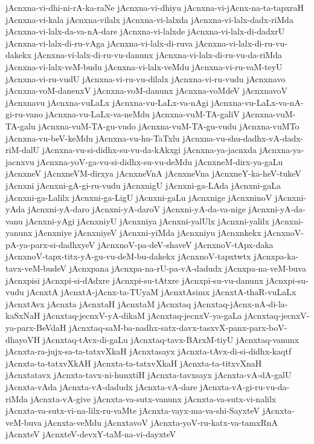 {jAcnxna-vi-dhi-ni-rA-ka-raNe
jAcnxna-vi-dhiyu
jAcnxna-vi-jAcnx-na-ta-tapxraH
jAcnxna-vi-kala
jAcnxna-vilalx
jAcnxna-vi-lalxda
jAcnxna-vi-lalx-dadx-riMda
jAcnxna-vi-lalx-da-va-nA-dare
jAcnxna-vi-lalxde
jAcnxna-vi-lalx-di-dadxrU
jAcnxna-vi-lalx-di-ru-vAga
jAcnxna-vi-lalx-di-ruva
jAcnxna-vi-lalx-di-ru-vu-dakekx
jAcnxna-vi-lalx-di-ru-vu-danunx
jAcnxna-vi-lalx-di-ru-vu-da-riMda
jAcnxna-vi-lalx-veM-budu
jAcnxna-vi-lalx-veMdu
jAcnxna-vi-ru-vaM-teyU
jAcnxna-vi-ru-vudU
jAcnxna-vi-ru-vu-dilalx
jAcnxna-vi-ru-vudu
jAcnxnavo
jAcnxna-voM-danenxV
jAcnxna-voM-danunx
jAcnxna-voMdeV
jAcnxnavoV
jAcnxnavu
jAcnxna-vuLaLx
jAcnxna-vu-LaLx-va-nAgi
jAcnxna-vu-LaLx-va-nA-gi-ru-vano
jAcnxna-vu-LaLx-va-neMdu
jAcnxna-vuM-TA-galiV
jAcnxna-vuM-TA-galu
jAcnxna-vuM-TA-gu-vudo
jAcnxna-vuM-TA-gu-vudu
jAcnxna-vuMTo
jAcnxna-vu-beV-keMdu
jAcnxna-vu-hu-TaTxlu
jAcnxna-vu-shu-dadhx-vA-dadx-riM-dalU
jAcnxna-vu-si-didhx-su-vu-da-kAkxgi
jAcnxna-ya-jacnxda
jAcnxna-ya-jacnxvu
jAcnxna-yoV-ga-vu-si-didhx-su-vu-deMdu
jAcnxneM-dirx-ya-gaLu
jAcnxneV
jAcnxneVM-dirxya
jAcnxneVnA
jAcnxneVna
jAcnxneY-ka-heV-tukeV
jAcnxni
jAcnxni-gA-gi-ru-vudu
jAcnxnigU
jAcnxni-ga-LAda
jAcnxni-gaLa
jAcnxni-ga-Lalilx
jAcnxni-ga-LigU
jAcnxni-gaLu
jAcnxnige
jAcnxninoV
jAcnxni-yAda
jAcnxni-yA-daro
jAcnxni-yA-daroV
jAcnxni-yA-da-va-nige
jAcnxni-yA-da-vanu
jAcnxni-yAgi
jAcnxniyU
jAcnxniya
jAcnxni-yalUlx
jAcnxni-yalilx
jAcnxni-yanunx
jAcnxniye
jAcnxniyeV
jAcnxni-yiMda
jAcnxniyu
jAcnxnkekx
jAcnxnoV-pA-ya-parx-si-dadhxyeV
jAcnxnoV-pa-deV-shaveV
jAcnxnoV-tApx-daka
jAcnxnoV-tapx-titx-yA-gu-vu-deM-bu-dakekx
jAcnxnoV-tapxtwtx
jAcnxpa-ka-tavx-veM-budeV
jAcnxpana
jAcnxpa-na-rU-pa-vA-dadudx
jAcnxpa-na-veM-buva
jAcnxpisi
jAcnxpi-si-dAdxre
jAcnxpi-su-tAtxre
jAcnxpi-su-vu-danunx
jAcnxpi-su-vudu
jAcnxtA
jAcnxtA-jAcnx-ta-TUyaM
jAcnxtAsimx
jAcnxtA-thaR-vuLaLx
jAcnxtAvx
jAcnxta
jAcnxtaH
jAcnxtaM
jAcnxtaq
jAcnxtaq-jAcnx-nA-di-la-kaSxNaH
jAcnxtaq-jecnxV-yA-dikaM
jAcnxtaq-jecnxV-ya-gaLa
jAcnxtaq-jecnxV-ya-parx-BeVdaH
jAcnxtaq-saM-ba-nadhx-satx-davx-tasxvX-panx-parx-boV-dhayoVH
jAcnxtaq-tAvx-di-gaLu
jAcnxtaq-tavx-BArxM-tiyU
jAcnxtaq-vanunx
jAcnxta-ra-jujx-sa-ta-tatxvXkaH
jAcnxtasayx
jAcnxta-tAvx-di-si-didhx-kaqtf
jAcnxta-ta-tatxvXkAH
jAcnxta-ta-tatxvXkaH
jAcnxta-ta-titxvXnaH
jAcnxtatavx
jAcnxta-tavx-ni-hunxtiH
jAcnxta-tavxsayx
jAcnxta-vA-dA-galU
jAcnxta-vAda
jAcnxta-vA-dadudx
jAcnxta-vA-dare
jAcnxta-vA-gi-ru-vu-da-riMda
jAcnxta-vA-give
jAcnxta-va-sutx-vanunx
jAcnxta-va-sutx-vi-nalilx
jAcnxta-va-sutx-vi-na-lilx-ru-vaMte
jAcnxta-vayx-ma-va-shi-SayxteV
jAcnxta-veM-buva
jAcnxta-veMdu
jAcnxtavoV
jAcnxta-yoV-ru-katx-va-tamxRnA
jAcnxteV
jAcnxteV-devxY-taM-na-vi-dayxteV
}
